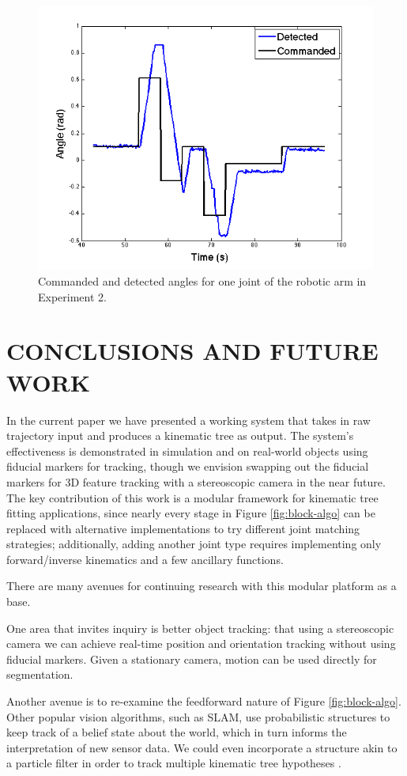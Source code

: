 \documentclass[letterpaper, 10 pt, conference]{ieeeconf}  %
\begin{document}
\begin{figure}[ht]
  \centering
  \includegraphics[width=.4\textwidth]{img/exp2b.png}
  \vspace{-.1in}
  \caption{Commanded and detected angles for one joint of the robotic arm in Experiment 2.}
  \label{fig:exp2}
\end{figure}

\section{CONCLUSIONS AND FUTURE WORK} \label{sec:conclusion}\label{sec:future}

In the current paper we have presented a working system that takes in raw trajectory input and produces a kinematic tree as output. The system's effectiveness is demonstrated in simulation and on real-world objects using fiducial markers for tracking, though we envision swapping out the fiducial markers for 3D feature tracking with a stereoscopic camera in the near future. The key contribution of this work is a modular framework for kinematic tree fitting applications, since nearly every stage in Figure \ref{fig:block-algo} can be replaced with alternative implementations to try different joint matching strategies; additionally, adding another joint type requires implementing only forward/inverse kinematics and a few ancillary functions.

There are many avenues for continuing research with this modular platform as a base. 

One area that invites inquiry is better object tracking: that using a stereoscopic camera we can achieve real-time position and orientation tracking without using fiducial markers. Given a stationary camera, motion can be used directly for segmentation.

Another avenue is to re-examine the feedforward nature of Figure \ref{fig:block-algo}. Other popular vision algorithms, such as SLAM, use probabilistic structures to keep track of a belief state about the world, which in turn informs the interpretation of new sensor data. We could even incorporate a structure akin to a particle filter in order to track multiple kinematic tree hypotheses \cite{Thrun2002}.
\end{document}
